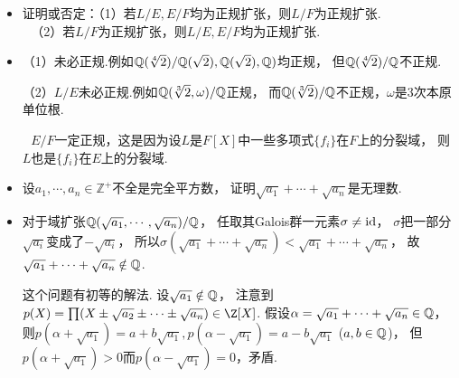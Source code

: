 \begin{itemize}
    （2）显然正确.

    \item[4.]
    证明或否定：（1）若$L/E,E/F$均为正规扩张，则$L/F$为正规扩张.\\
    \qquad\qquad\quad\ \,（2）若$L/F$为正规扩张，则$L/E,E/F$均为正规扩张.

    \item[\textbf{证明.}]
    （1）未必正规.例如$\mathbb{Q}(\sqrt[4]{2})/\mathbb{Q}(\sqrt{2}),\mathbb{Q}(\sqrt{2}),\mathbb{Q})$均正规，
    但$\mathbb{Q}(\sqrt[4]{2})/\mathbb{Q}$不正规.

    （2）$L/E$未必正规.例如$\mathbb{Q}(\sqrt[3]{2},\omega)/\mathbb{Q}$正规，
    而$\mathbb{Q}(\sqrt[3]{2})/\mathbb{Q}$不正规，$\omega$是$3$次本原单位根.

    \quad\ \,$E/F$一定正规，这是因为设$L$是$F[X]$中一些多项式$\{f_i\}$在$F$上的分裂域，
    则$L$也是$\{f_i\}$在$E$上的分裂域.

    \item[5.]
    设$a_1,\cdots,a_n\in\mathbb{Z}^+$不全是完全平方数，
    证明$\sqrt{a_1}+\cdots+\sqrt{a_n}$是无理数.
    
    \item[\textbf{证明.}]
    对于域扩张$\mathbb{Q}(\sqrt{a_1},\cdots,\sqrt{a_n})/\mathbb{Q}$，
    任取其Galois群一元素$\sigma\neq\operatorname{id}$，
    $\sigma$把一部分$\sqrt{a_i}$变成了$-\sqrt{a_i}$，
    所以$\sigma(\sqrt{a_1}+\cdots+\sqrt{a_n})<\sqrt{a_1}+\cdots+\sqrt{a_n}$，
    故$\sqrt{a_1}+\cdots+\sqrt{a_n}\notin\mathbb{Q}$.

    这个问题有初等的解法.
    设$\sqrt{a_1}\notin\mathbb{Q}$，
    注意到$p(X)=\prod(X\pm\sqrt{a_2}\pm\cdots\pm\sqrt{a_n})\in\Z[X]$.
    假设$\alpha=\sqrt{a_1}+\cdots+\sqrt{a_n}\in\mathbb{Q}$，
    则$p(\alpha+\sqrt{a_1})=a+b\sqrt{a_1},
    p(\alpha-\sqrt{a_1})=a-b\sqrt{a_1}$ ($a,b\in\mathbb{Q}$)，
    但$p(\alpha+\sqrt{a_1})>0$而$p(\alpha-\sqrt{a_1})=0$，矛盾.
\end{itemize}